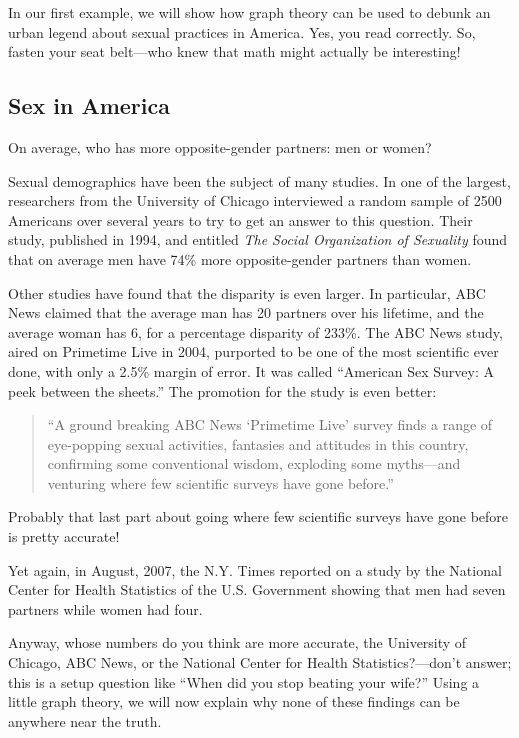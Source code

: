 In our first example, we will show how graph theory can be used to
debunk an urban legend about sexual practices in America.  Yes, you
read correctly.  So, fasten your seat belt---who knew that math might
actually be interesting!

\subsection{Sex in America}

On average, who has more opposite-gender partners: men or women?

Sexual demographics have been the subject of many studies.  In one of the
largest, researchers from the University of Chicago interviewed a random
sample of 2500 Americans over several years to try to get an answer to this
question.  Their study, published in 1994, and entitled \emph{The Social
  Organization of Sexuality} found that on average men have 74\% more
opposite-gender partners than women.

Other studies have found that the disparity is even larger.  In
particular, ABC News claimed that the average man has 20 partners over his
lifetime, and the average woman has 6, for a percentage disparity of
233\%.  The ABC News study, aired on Primetime Live in 2004, purported to
be one of the most scientific ever done, with only a 2.5\% margin of
error.  It was called ``American Sex Survey: A peek between the sheets.''
The promotion for the study is even better:
\begin{quote}
``A ground breaking ABC News `Primetime Live' survey finds a range of
eye-popping sexual activities, fantasies and attitudes in this country,
confirming some conventional wisdom, exploding some myths---and venturing
where few scientific surveys have gone before.''
\end{quote}
Probably that last part about going where few scientific surveys have gone
before is pretty accurate!

Yet again, in August, 2007, the N.Y. Times reported
on a study by the National Center for Health Statistics of the
U.S. Government showing that men had seven partners while women had
four.

Anyway, whose numbers do you think are more accurate, the University
of Chicago, ABC News, or the National Center for Health
Statistics?---don't answer; this is a setup question like ``When did
you stop beating your wife?''  Using a little graph theory, we will
now explain why none of these findings can be anywhere near the truth.

